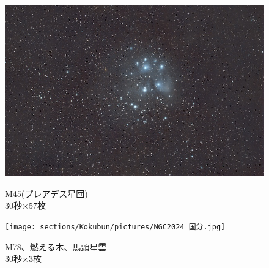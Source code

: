 \begin{figure}[H]
  \centering
  \begin{minipage}{0.48\linewidth}
    \centering
    \includegraphics[width=\linewidth]{sections/Kokubun/pictures/M45.jpg}
    \caption{M45(プレアデス星団)\\
  30秒×57枚}
  \label{M45}
  \end{minipage}
  \begin{minipage}{0.48\linewidth}
    \centering
    \texttt{[image: sections/Kokubun/pictures/NGC2024\_国分.jpg]}
    \caption{M78、燃える木、馬頭星雲\\
  30秒×3枚}
  \label{M4}
  \end{minipage}
\end{figure}





